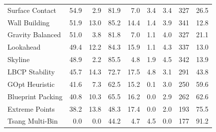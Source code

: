 \documentclass[border=8pt]{standalone}
\begin{document}
\begin{table}[htbp]
\begin{tabular}{lrrrrrrrr}
\rowcolor{rowalt} Surface Contact & 54.9 & 2.9 & 81.9 & 7.0 & 3.4 & 3.4 & 327 & 26.5 \\
Wall Building & 51.9 & 13.0 & 85.2 & 14.4 & 1.4 & 3.9 & 341 & 12.8 \\
\rowcolor{rowalt} Gravity Balanced & 51.0 & 3.8 & 81.8 & 7.0 & 1.1 & 4.0 & 327 & 21.1 \\
Lookahead & 49.4 & 12.2 & 84.3 & 15.9 & 1.1 & 4.3 & 337 & 13.0 \\
\rowcolor{rowalt} Skyline & 48.9 & 2.2 & 85.5 & 4.8 & 1.9 & 4.5 & 342 & 13.9 \\
LBCP Stability & 45.7 & 14.3 & 72.7 & 17.5 & 4.8 & 3.1 & 291 & 43.8 \\
\rowcolor{rowalt} GOpt Heuristic & 41.6 & 7.3 & 62.5 & 15.2 & 0.1 & 3.0 & 250 & 59.6 \\
Blueprint Packing & 40.8 & 10.3 & 65.5 & 16.2 & 0.0 & 2.9 & 262 & 62.6 \\
\rowcolor{rowalt} Extreme Points & 38.2 & 13.8 & 48.3 & 17.4 & 0.0 & 2.0 & 193 & 75.5 \\
Tsang Multi-Bin & 0.0 & 0.0 & 44.2 & 4.7 & 4.5 & 0.0 & 177 & 91.2 \\
\bottomrule
\end{tabular}
\end{table}
\end{document}
